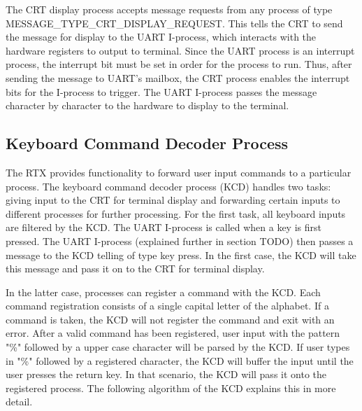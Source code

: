 \documentclass[12pt]{report}
\begin{document}
 The CRT display process accepts message requests from any process of type MESSAGE\_TYPE\_CRT\_DISPLAY\_REQUEST. This tells the CRT to send the message for display to the UART I-process, which interacts with the hardware registers to output to terminal. Since the UART process is an interrupt process, the interrupt bit must be set in order for the process to run. Thus, after sending the message to UART's mailbox, the CRT process enables the interrupt bits for the I-process to trigger. The UART I-process passes the message character by character to the hardware to display to the terminal.

\subsection{Keyboard Command Decoder Process}
\label{sec:kcd_process}
The RTX provides functionality to forward user input commands to a particular process. The keyboard command decoder process (KCD) handles two tasks: giving input to the CRT for terminal display and forwarding certain inputs to different processes for further processing. For the first task, all keyboard inputs are filtered by the KCD. The UART I-process is called when a key is first pressed. The UART I-process (explained further in section TODO) then passes a message to the KCD telling of type key press. In the first case, the KCD will take this message and pass it on to the CRT for terminal display.

In the latter case, processes can register a command with the KCD. Each command registration consists of a single capital letter of the alphabet. If a command is taken, the KCD will not register the command and exit with an error. After a valid command has been registered, user input with the pattern "\%" followed by a upper case character will be parsed by the KCD. If user types in "\%" followed by a registered character, the KCD will buffer the input until the user presses the return key. In that scenario, the KCD will pass it onto the registered process. The following algorithm of the KCD explains this in more detail.
\end{document}
